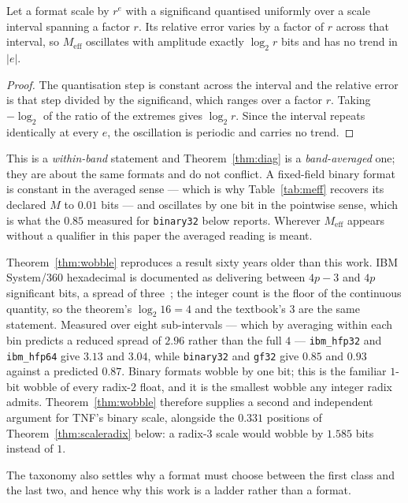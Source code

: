 \begin{theorem}
\label{thm:wobble}
Let a format scale by $r^{e}$ with a significand quantised uniformly over a
scale interval spanning a factor $r$. Its relative error varies by a factor of
$r$ across that interval, so $M_{\mathrm{eff}}$ oscillates with amplitude exactly
$\log_2 r$ bits and has no trend in $|e|$.
\end{theorem}

\begin{proof}
The quantisation step is constant across the interval and the relative error is
that step divided by the significand, which ranges over a factor $r$. Taking
$-\log_2$ of the ratio of the extremes gives $\log_2 r$. Since the interval
repeats identically at every $e$, the oscillation is periodic and carries no
trend.
\end{proof}

This is a \emph{within-band} statement and Theorem~\ref{thm:diag} is a
\emph{band-averaged} one; they are about the same formats and do not conflict.
A fixed-field binary format is constant in the averaged sense --- which is why
Table~\ref{tab:meff} recovers its declared $M$ to $0.01$ bits --- and oscillates by
one bit in the pointwise sense, which is what the $0.85$ measured for
\texttt{binary32} below reports. Wherever $M_{\mathrm{eff}}$ appears without a
qualifier in this paper the averaged reading is meant.

Theorem~\ref{thm:wobble} reproduces a result sixty years older than this work.
IBM System/360 hexadecimal is documented as delivering between $4p-3$ and $4p$
significant bits, a spread of three~\cite{goldberg1991,ibmhfp}; the integer count
is the floor of the continuous quantity, so the theorem's $\log_2 16 = 4$ and the
textbook's $3$ are the same statement. Measured over eight sub-intervals ---
which by averaging within each bin predicts a reduced spread of $2.96$ rather than
the full $4$ --- \texttt{ibm\_hfp32} and \texttt{ibm\_hfp64} give $3.13$ and
$3.04$, while \texttt{binary32} and \texttt{gf32} give $0.85$ and $0.93$ against a
predicted $0.87$. Binary formats wobble by one bit; this is the familiar
$1$-bit wobble of every radix-2 float, and it is the smallest wobble any integer
radix admits. Theorem~\ref{thm:wobble} therefore supplies a second and independent
argument for TNF's binary scale, alongside the $0.331$ positions of
Theorem~\ref{thm:scaleradix} below: a radix-3 scale would wobble by $1.585$ bits
instead of $1$.

The taxonomy also settles why a format must choose between the first class and the
last two, and hence why this work is a ladder rather than a format.

